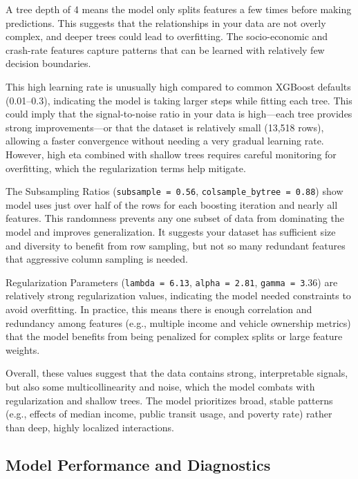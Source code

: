 \documentclass[
  number,
  review,
  3p]{elsarticle}
\begin{document}
A tree depth of 4 means the model only splits features a few times
before making predictions. This suggests that the relationships in your
data are not overly complex, and deeper trees could lead to overfitting.
The socio-economic and crash-rate features capture patterns that can be
learned with relatively few decision boundaries.

This high learning rate is unusually high compared to common XGBoost
defaults (0.01--0.3), indicating the model is taking larger steps while
fitting each tree. This could imply that the signal-to-noise ratio in
your data is high---each tree provides strong improvements---or that the
dataset is relatively small (13,518 rows), allowing a faster convergence
without needing a very gradual learning rate. However, high eta combined
with shallow trees requires careful monitoring for overfitting, which
the regularization terms help mitigate.

The Subsampling Ratios (\texttt{subsample\ =\ 0.56},
\texttt{colsample\_bytree\ =\ 0.88}) show model uses just over half of
the rows for each boosting iteration and nearly all features. This
randomness prevents any one subset of data from dominating the model and
improves generalization. It suggests your dataset has sufficient size
and diversity to benefit from row sampling, but not so many redundant
features that aggressive column sampling is needed.

Regularization Parameters (\texttt{lambda\ =\ 6.13},
\texttt{alpha\ =\ 2.81}, \texttt{gamma\ =\ 3}.36) are relatively strong
regularization values, indicating the model needed constraints to avoid
overfitting. In practice, this means there is enough correlation and
redundancy among features (e.g., multiple income and vehicle ownership
metrics) that the model benefits from being penalized for complex splits
or large feature weights.

Overall, these values suggest that the data contains strong,
interpretable signals, but also some multicollinearity and noise, which
the model combats with regularization and shallow trees. The model
prioritizes broad, stable patterns (e.g., effects of median income,
public transit usage, and poverty rate) rather than deep, highly
localized interactions.

\subsection{\texorpdfstring{\textbf{Model Performance and
Diagnostics}}{Model Performance and Diagnostics}}\label{model-performance-and-diagnostics}
\end{document}
